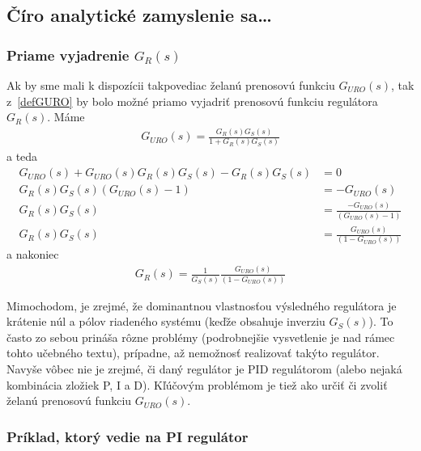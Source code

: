 \documentclass[a4paper, 10pt, ]{article}
\begin{document}
\subsection{Číro analytické zamyslenie sa\ldots}
\label{Číro analytické zamyslenie sa}

\subsubsection{Priame vyjadrenie $G_R(s)$}

Ak by sme mali k dispozícii takpovediac želanú prenosovú funkciu $G_{URO}(s)$, tak z~\eqref{defGURO} by bolo možné priamo vyjadriť prenosovú funkciu regulátora $G_R(s)$. Máme
\begin{align} 
    G_{URO}(s)  = \frac{G_R(s) G_S(s)}{1 + G_R(s) G_S(s)}
\end{align}
a teda
\begin{align} 
    G_{URO}(s) + G_{URO}(s) G_R(s) G_S(s) - G_R(s) G_S(s) &= 0 \\
    G_R(s) G_S(s) \left( G_{URO}(s) - 1 \right) &= - G_{URO}(s) \\
    G_R(s) G_S(s) &= \frac{- G_{URO}(s)}{\left( G_{URO}(s) - 1 \right)} \\
    G_R(s) G_S(s) &= \frac{ G_{URO}(s)}{\left( 1 - G_{URO}(s) \right)} 
\end{align}
a nakoniec
\begin{align} 
    G_R(s)  = \frac{1}{G_S(s)} \frac{ G_{URO}(s)}{\left( 1 - G_{URO}(s) \right)} 
\end{align}

Mimochodom, je zrejmé, že dominantnou vlastnosťou výsledného regulátora je krátenie núl a pólov riadeného systému (keďže obsahuje inverziu $G_S(s)$). To často zo sebou prináša rôzne problémy (podrobnejšie vysvetlenie je nad rámec tohto učebného textu), prípadne, až nemožnosť realizovať takýto regulátor. Navyše vôbec nie je zrejmé, či daný regulátor je PID regulátorom (alebo nejaká kombinácia zložiek P, I a D). Kľúčovým problémom je tiež ako určiť či zvoliť želanú prenosovú funkciu $G_{URO}(s)$.











\subsubsection{Príklad, ktorý vedie na PI regulátor}
\end{document}
